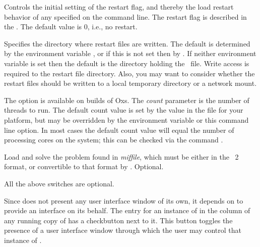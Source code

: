\begin{description}
  Controls the initial setting of the restart flag, and thereby
  the load restart behavior of any  specified on the command
  line.  The restart flag is described in the
  . The default value is 0, i.e., no
  restart.
\item[\optkey{-restartfiledir dir}]
  Specifies the directory where restart files are written.
  The default is determined by the environment variable
  ,
  or if this is not set then by
  .  If
  neither environment variable is set then the default is the
  directory holding the \MIF\ file.  Write access is required to the
  restart file directory.  Also, you may want to consider whether the
  restart files should be written to a local temporary directory or a
  network mount.
\item[\optkey{-threads \boa count\bca}]
  The option is available on  builds of Oxs.  The \textit{count}
  parameter is the number of threads to run.  The default count value is
  set by the  value in
  the  file for your platform, but may be
  overridden by
  the 
  environment variable or this command line option.  In most cases the
  default count value will equal the number of processing cores on the
  system; this can be checked via the command .
\item[\optkey{miffile}]
  Load and solve the problem found in \textit{miffile}, which must be
  either in the \MIF~2 format, or convertible to that format by
  .  Optional.
\end{description}
All the above switches are optional.

Since  does not present
any user interface window of its own, it depends on
 to provide an interface on
its behalf.  The entry for an instance of  in the
 column of any running copy of
 has a checkbutton next to it.  This button toggles the
presence of a user interface window through which the user may control
that instance of .


